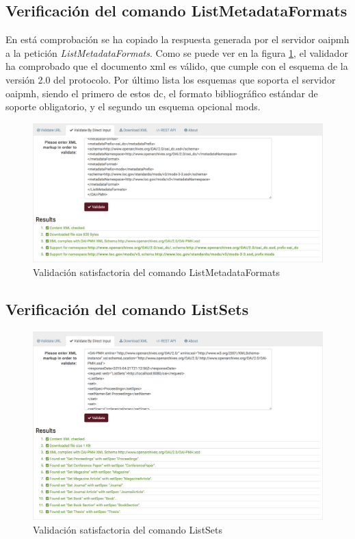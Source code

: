 \subsection{Verificación del comando ListMetadataFormats}

En está comprobación se ha copiado la respuesta generada por el servidor \acrshort{oaipmh} a la petición \textit{ListMetadataFormats}. Como se puede ver en la figura \ref{fig:listmetadataformats}, el validador ha comprobado que el documento \acrshort{xml} es válido, que cumple con el esquema de la versión 2.0 del protocolo. Por último lista los esquemas que soporta el servidor \acrshort{oaipmh}, siendo el primero de estos \acrlong{dc}, el formato bibliográfico estándar de soporte obligatorio, y el segundo un esquema opcional \acrfull{mods}\cite{MODS}.

\begin{figure}[!htbp]
	\centering
	\includegraphics[scale=0.32]{fig/oaipmh_validations/ListMetadataFormats}
	\caption{Validación satisfactoria del comando ListMetadataFormats}
	\label{fig:listmetadataformats}
\end{figure}

\subsection{Verificación del comando ListSets}

\begin{figure}[!htbp]
	\centering
	\includegraphics[scale=0.32]{fig/oaipmh_validations/ListSets}
	\caption{Validación satisfactoria del comando ListSets}
	\label{fig:listsets}
\end{figure}

